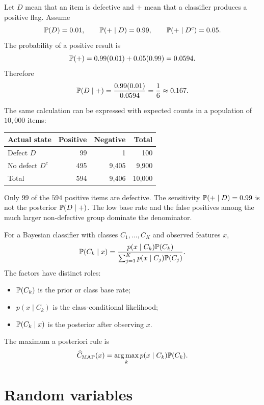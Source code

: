 \begin{example}
Let \(D\) mean that an item is defective and \(+\) mean that a classifier
produces a positive flag. Assume
\[
  \mathbb{P}(D)=0.01,\qquad
  \mathbb{P}(+\mid D)=0.99,\qquad
  \mathbb{P}(+\mid D^c)=0.05.
\]
The probability of a positive result is
\[
  \mathbb{P}(+)=0.99(0.01)+0.05(0.99)=0.0594.
\]
Therefore
\[
  \mathbb{P}(D\mid +)
  =\frac{0.99(0.01)}{0.0594}
  =\frac16\approx 0.167.
\]

The same calculation can be expressed with expected counts in a population of
\(10{,}000\) items:
\begin{center}
\begin{tabular}{@{}lrrr@{}}
\toprule
\textbf{Actual state} & \textbf{Positive} & \textbf{Negative} & \textbf{Total} \\
\midrule
Defect \(D\) & 99 & 1 & 100 \\
No defect \(D^c\) & 495 & 9,405 & 9,900 \\
\midrule
Total & 594 & 9,406 & 10,000 \\
\bottomrule
\end{tabular}
\end{center}
Only \(99\) of the \(594\) positive items are defective. The sensitivity
\(\mathbb{P}(+\mid D)=0.99\) is not the posterior \(\mathbb{P}(D\mid +)\). The low base
rate and the false positives among the much larger non-defective group dominate
the denominator.
\end{example}

For a Bayesian classifier with classes \(C_1,\ldots,C_K\) and observed features
\(x\),
\begin{equation}
  \mathbb{P}(C_k\mid x)
  =\frac{p(x\mid C_k)\mathbb{P}(C_k)}
  {\sum_{j=1}^{K}p(x\mid C_j)\mathbb{P}(C_j)}.
  \label{eq:bayesian-classifier}
\end{equation}
The factors have distinct roles:
\begin{itemize}
  \item \(\mathbb{P}(C_k)\) is the prior or class base rate;
  \item \(p(x\mid C_k)\) is the class-conditional likelihood;
  \item \(\mathbb{P}(C_k\mid x)\) is the posterior after observing \(x\).
\end{itemize}
The maximum a posteriori rule is
\[
  \widehat C_{\mathrm{MAP}}(x)
  =\operatorname*{arg\,max}_k p(x\mid C_k)\mathbb{P}(C_k).
\]

\section{Random variables}

